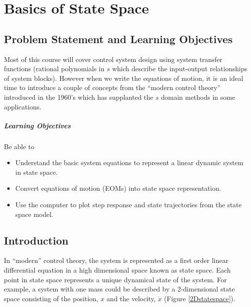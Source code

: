  

\chapter{Basics of State Space}\label{BasicsStateSpaceChapter}
 

\section{Problem Statement and Learning Objectives}
 
Most of this course will cover control system design using system transfer functions (rational polynomials in $s$ which describe the input-output relationships of system blocks).  However when we write the equations of motion, it is an ideal time to introduce a couple of concepts from the ``modern control theory'' introduced in the 1960's which has supplanted the $s$ domain methods in some applications.  

\paragraph{Learning Objectives}
Be able to
\begin{itemize}
    \item Understand the basic system equations to represent a linear
    dynamic system in state space. 
    \item Convert equations of motion (EOMs) into state space
    representation.
    \item Use the computer to plot step response and state trajectories from
    the state space model. 
\end{itemize}

\section{Introduction}
In ``modern'' control theory, the system is represented as a first order linear differential equation in a high dimensional space known as state space.  Each point in state space represents a unique dynamical state of the system.   For example, a system with one mass could be described by a 2-dimensional state space consisting of the position, $x$ and the velocity, $\dot{x}$ (Figure \ref{2Dstatespace}).

